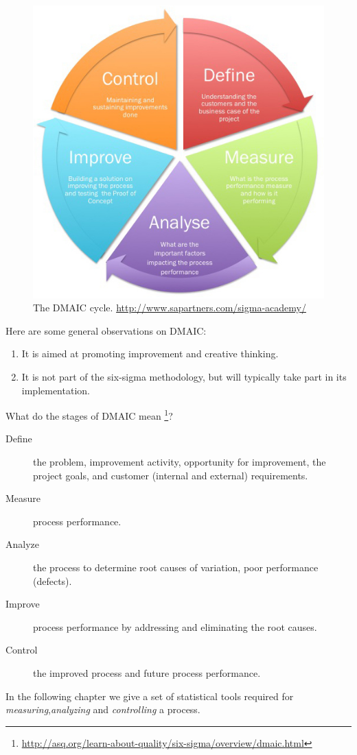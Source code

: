 \begin{figure}[t]
\centering
\includegraphics[width=0.6\linewidth]{art/Sigma_detail}
\caption[DMAIC]{The DMAIC cycle. \newline
\url{http://www.sapartners.com/sigma-academy/}}
\label{fig:DMAIC}
\end{figure}

Here are some general observations on DMAIC:
\begin{enumerate}
\item It is aimed at promoting improvement and creative thinking.
\item It is not part of the six-sigma methodology, but will typically take part in its implementation.
\end{enumerate}

What do the stages of DMAIC mean \footnote{\url{http://asq.org/learn-about-quality/six-sigma/overview/dmaic.html}}?
\begin{description}
\item [Define] the problem, improvement activity, opportunity for improvement, the project goals, and customer (internal and external) requirements.
\item [Measure] process performance.
\item [Analyze] the process to determine root causes of variation, poor performance (defects).
\item [Improve] process performance by addressing and eliminating the root causes.
\item [Control] the improved process and future process performance.
\end{description}

In the following chapter we give a set of statistical tools required for \emph{measuring},\emph{analyzing} and \emph{controlling} a process.